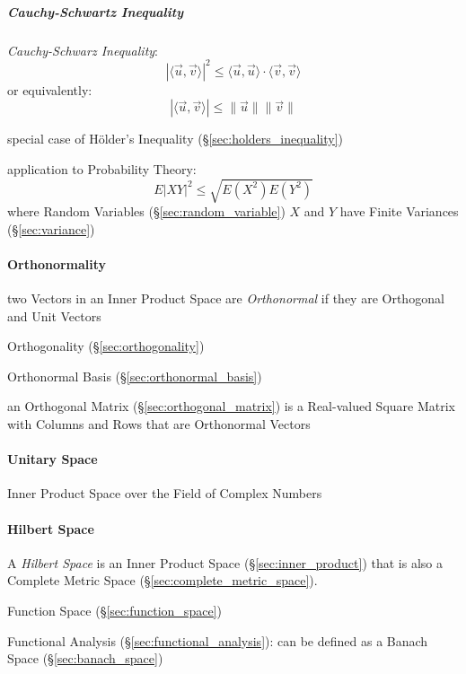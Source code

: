 \subparagraph{Cauchy-Schwartz Inequality}\label{sec:cauchy_schwarz}\hfill

\emph{Cauchy-Schwarz Inequality}:
\[
  |\langle{\vec{u},\vec{v}}\rangle|^2 \leq
    \langle{\vec{u},\vec{u}}\rangle \cdot \langle{\vec{v},\vec{v}}\rangle
\]
or equivalently:
\[
  |\langle{\vec{u},\vec{v}}\rangle| \leq \|\vec{u}\| \|\vec{v}\|
\]

special case of H\"older's Inequality (\S\ref{sec:holders_inequality})

application to Probability Theory:
\[
  E|XY|^2 \leq \sqrt{E(X^2)E(Y^2)}
\]
where Random Variables (\S\ref{sec:random_variable}) $X$ and $Y$ have Finite
Variances (\S\ref{sec:variance})



\paragraph{Orthonormality}\label{sec:orthonormality}\hfill

two Vectors in an Inner Product Space are \emph{Orthonormal} if they are
Orthogonal and Unit Vectors

\fist Orthogonality (\S\ref{sec:orthogonality})

\fist Orthonormal Basis (\S\ref{sec:orthonormal_basis})

an Orthogonal Matrix (\S\ref{sec:orthogonal_matrix}) is a Real-valued Square
Matrix with Columns and Rows that are Orthonormal Vectors



\paragraph{Unitary Space}\label{sec:unitary_space}\hfill

Inner Product Space over the Field of Complex Numbers



\paragraph{Hilbert Space}\label{sec:hilbert_space}\hfill


A \emph{Hilbert Space} is an Inner Product Space (\S\ref{sec:inner_product})
that is also a Complete Metric Space (\S\ref{sec:complete_metric_space}).

Function Space (\S\ref{sec:function_space})

Functional Analysis (\S\ref{sec:functional_analysis}): can be defined as a
Banach Space (\S\ref{sec:banach_space})


